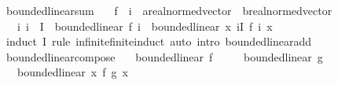 \begin{isabellebody}
\endisatagproof
{\isafoldproof}%
%
\isadelimproof
\isanewline
%
\endisadelimproof
\isanewline
{}\isamarkupfalse%
\ bounded{\isacharunderscore}{\kern0pt}linear{\isacharunderscore}{\kern0pt}sum{\isacharcolon}{\kern0pt}\isanewline
\ \ \ f\ {\isacharcolon}{\kern0pt}{\isacharcolon}{\kern0pt}\ {\isachardoublequoteopen}{\isacharprime}{\kern0pt}i\ {\isasymRightarrow}\ {\isacharprime}{\kern0pt}a{\isacharcolon}{\kern0pt}{\isacharcolon}{\kern0pt}real{\isacharunderscore}{\kern0pt}normed{\isacharunderscore}{\kern0pt}vector\ {\isasymRightarrow}\ {\isacharprime}{\kern0pt}b{\isacharcolon}{\kern0pt}{\isacharcolon}{\kern0pt}real{\isacharunderscore}{\kern0pt}normed{\isacharunderscore}{\kern0pt}vector{\isachardoublequoteclose}\isanewline
\ \ \ {\isachardoublequoteopen}{\isacharparenleft}{\kern0pt}{\isasymAnd}i{\isachardot}{\kern0pt}\ i\ {\isasymin}\ I\ {\isasymLongrightarrow}\ bounded{\isacharunderscore}{\kern0pt}linear\ {\isacharparenleft}{\kern0pt}f\ i{\isacharparenright}{\kern0pt}{\isacharparenright}{\kern0pt}\ {\isasymLongrightarrow}\ bounded{\isacharunderscore}{\kern0pt}linear\ {\isacharparenleft}{\kern0pt}{\isasymlambda}x{\isachardot}{\kern0pt}\ {\isasymSum}i{\isasymin}I{\isachardot}{\kern0pt}\ f\ i\ x{\isacharparenright}{\kern0pt}{\isachardoublequoteclose}\isanewline
%
\isadelimproof
\ \ %
\endisadelimproof
%
\isatagproof
{}\isamarkupfalse%
\ {\isacharparenleft}{\kern0pt}induct\ I\ rule{\isacharcolon}{\kern0pt}\ infinite{\isacharunderscore}{\kern0pt}finite{\isacharunderscore}{\kern0pt}induct{\isacharparenright}{\kern0pt}\ {\isacharparenleft}{\kern0pt}auto\ intro{\isacharbang}{\kern0pt}{\isacharcolon}{\kern0pt}\ bounded{\isacharunderscore}{\kern0pt}linear{\isacharunderscore}{\kern0pt}add{\isacharparenright}{\kern0pt}%
\endisatagproof
{\isafoldproof}%
%
\isadelimproof
\isanewline
%
\endisadelimproof
\isanewline
{}\isamarkupfalse%
\ bounded{\isacharunderscore}{\kern0pt}linear{\isacharunderscore}{\kern0pt}compose{\isacharcolon}{\kern0pt}\isanewline
\ \ \ {\isachardoublequoteopen}bounded{\isacharunderscore}{\kern0pt}linear\ f{\isachardoublequoteclose}\isanewline
\ \ \ \ \ {\isachardoublequoteopen}bounded{\isacharunderscore}{\kern0pt}linear\ g{\isachardoublequoteclose}\isanewline
\ \ \ {\isachardoublequoteopen}bounded{\isacharunderscore}{\kern0pt}linear\ {\isacharparenleft}{\kern0pt}{\isasymlambda}x{\isachardot}{\kern0pt}\ f\ {\isacharparenleft}{\kern0pt}g\ x{\isacharparenright}{\kern0pt}{\isacharparenright}{\kern0pt}{\isachardoublequoteclose}\isanewline

\end{isabellebody}
